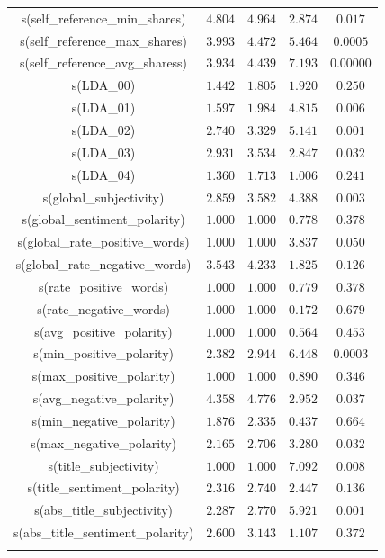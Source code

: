 \begin{table}[h]
\begin{tabular}{@{\extracolsep{5pt}} ccccc}
s(self\_reference\_min\_shares) & $4.804$ & $4.964$ & $2.874$ & $0.017$ \\ 
s(self\_reference\_max\_shares) & $3.993$ & $4.472$ & $5.464$ & $0.0005$ \\ 
s(self\_reference\_avg\_sharess) & $3.934$ & $4.439$ & $7.193$ & $0.00000$ \\ 
s(LDA\_00) & $1.442$ & $1.805$ & $1.920$ & $0.250$ \\ 
s(LDA\_01) & $1.597$ & $1.984$ & $4.815$ & $0.006$ \\ 
s(LDA\_02) & $2.740$ & $3.329$ & $5.141$ & $0.001$ \\ 
s(LDA\_03) & $2.931$ & $3.534$ & $2.847$ & $0.032$ \\ 
s(LDA\_04) & $1.360$ & $1.713$ & $1.006$ & $0.241$ \\ 
s(global\_subjectivity) & $2.859$ & $3.582$ & $4.388$ & $0.003$ \\ 
s(global\_sentiment\_polarity) & $1.000$ & $1.000$ & $0.778$ & $0.378$ \\ 
s(global\_rate\_positive\_words) & $1.000$ & $1.000$ & $3.837$ & $0.050$ \\ 
s(global\_rate\_negative\_words) & $3.543$ & $4.233$ & $1.825$ & $0.126$ \\ 
s(rate\_positive\_words) & $1.000$ & $1.000$ & $0.779$ & $0.378$ \\ 
s(rate\_negative\_words) & $1.000$ & $1.000$ & $0.172$ & $0.679$ \\ 
s(avg\_positive\_polarity) & $1.000$ & $1.000$ & $0.564$ & $0.453$ \\ 
s(min\_positive\_polarity) & $2.382$ & $2.944$ & $6.448$ & $0.0003$ \\ 
s(max\_positive\_polarity) & $1.000$ & $1.000$ & $0.890$ & $0.346$ \\ 
s(avg\_negative\_polarity) & $4.358$ & $4.776$ & $2.952$ & $0.037$ \\ 
s(min\_negative\_polarity) & $1.876$ & $2.335$ & $0.437$ & $0.664$ \\ 
s(max\_negative\_polarity) & $2.165$ & $2.706$ & $3.280$ & $0.032$ \\ 
s(title\_subjectivity) & $1.000$ & $1.000$ & $7.092$ & $0.008$ \\ 
s(title\_sentiment\_polarity) & $2.316$ & $2.740$ & $2.447$ & $0.136$ \\ 
s(abs\_title\_subjectivity) & $2.287$ & $2.770$ & $5.921$ & $0.001$ \\ 
s(abs\_title\_sentiment\_polarity) & $2.600$ & $3.143$ & $1.107$ & $0.372$ \\ 
\hline \\[-1.8ex] 
\end{tabular} 
\end{table} 
